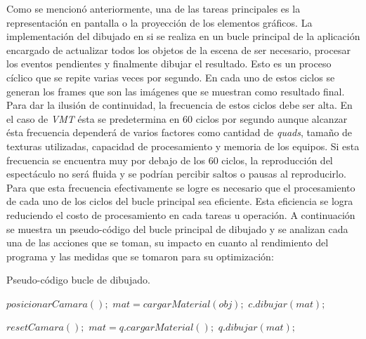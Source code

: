 Como se mencionó anteriormente, una de las tareas principales es la representación en pantalla o la proyección de los elementos gráficos. La implementación del dibujado en si se realiza en un bucle principal de la aplicación encargado de actualizar todos los objetos de la escena de ser necesario, procesar los eventos pendientes y finalmente dibujar el resultado. Esto es un proceso cíclico que se repite varias veces por segundo.
En cada uno de estos ciclos se generan los frames que son las imágenes que se muestran como resultado final.
Para dar la ilusión de continuidad, la frecuencia de estos ciclos debe ser alta. En el caso de \emph{VMT} ésta se predetermina en 60 ciclos por segundo aunque alcanzar ésta frecuencia dependerá de varios factores como cantidad de \emph{quads}, tamaño de texturas utilizadas, capacidad de procesamiento y memoria de los equipos.
Si esta frecuencia se encuentra muy por debajo de los 60 ciclos, la reproducción del espectáculo no será fluida y se podrían percibir saltos o pausas al reproducirlo.
Para que esta frecuencia efectivamente se logre es necesario que el procesamiento de cada uno de los ciclos del bucle principal sea eficiente. Esta eficiencia se logra reduciendo el costo de procesamiento en cada tareas u operación. A continuación se muestra un pseudo-código del bucle principal de dibujado y se analizan cada una de las acciones que se toman, su impacto en cuanto al rendimiento del programa y las medidas que se tomaron para su optimización:

\begin{algorithm}
    \caption{Pseudo-código bucle de dibujado.}
    \label{alg:mainLoop}
    \begin{algorithmic}
      \State $posicionarCamara();$
             \State $mat = cargarMaterial(obj);$
             \State $c.dibujar(mat);$
         \EndFor
      \EndFor

      \State $resetCamara();$
         \State $mat = q.cargarMaterial();$
         \State $q.dibujar(mat);$
      \EndFor
    \end{algorithmic}
\end{algorithm}


